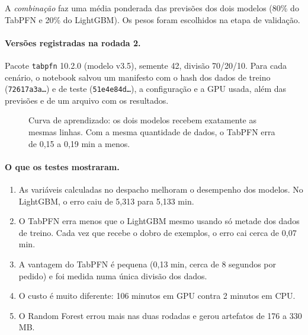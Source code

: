 \documentclass[11pt,a4paper]{article}
\begin{document}
\noindent A \emph{combinação} faz uma média ponderada das previsões dos dois modelos (80\% do
TabPFN e 20\% do LightGBM). Os pesos foram escolhidos na etapa de validação.

\paragraph{Versões registradas na rodada 2.} Pacote \texttt{tabpfn} 10.2.0 (modelo v3.5),
semente 42, divisão 70/20/10. Para cada cenário, o notebook salvou um manifesto com o hash
dos dados de treino (\texttt{72617a3a\ldots}) e de teste (\texttt{51e4e84d\ldots}), a
configuração e a GPU usada, além das previsões e de um arquivo com os resultados.

\begin{figure}[H]
\centering
{}
\caption{Curva de aprendizado: os dois modelos recebem exatamente as mesmas linhas. Com a mesma
quantidade de dados, o TabPFN erra de 0,15 a 0,19 min a menos.}
\label{fig:lc}
\end{figure}

\paragraph{O que os testes mostraram.}
\begin{enumerate}
  \item As variáveis calculadas no despacho melhoram o desempenho dos modelos. No LightGBM, o erro caiu de 5,313 para 5,133 min.
  \item O TabPFN erra menos que o LightGBM mesmo usando só metade dos dados de treino. Cada vez que
        recebe o dobro de exemplos, o erro cai cerca de 0,07 min.
  \item A vantagem do TabPFN é pequena (0,13 min, cerca de 8 segundos por pedido) e foi
        medida numa única divisão dos dados.
  \item O custo é muito diferente: 106 minutos em GPU contra 2 minutos em CPU.
  \item O Random Forest errou mais nas duas rodadas e gerou artefatos de 176 a 330 MB.
\end{enumerate}
\end{document}
